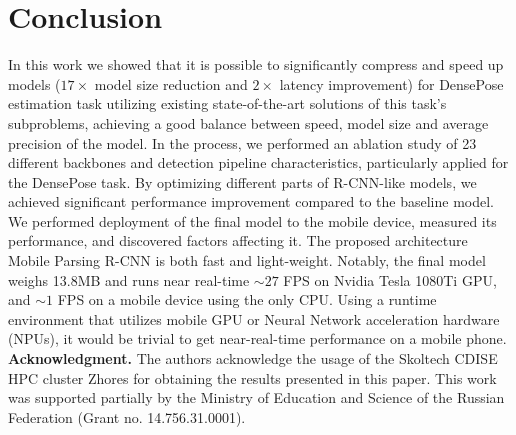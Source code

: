 \section{Conclusion}

In this work we showed that it is possible to significantly compress and speed up models ($17\times$ model size reduction and $2\times$ latency improvement) for DensePose estimation task utilizing existing state-of-the-art solutions of this task's subproblems, achieving a good balance between speed, model size and average precision of the model. In the process, we performed an ablation study of 23 different backbones and detection pipeline characteristics, particularly applied for the DensePose task.
By optimizing different parts of R-CNN-like models, we achieved significant performance improvement compared to the baseline model.
We performed deployment of the final model to the mobile device, measured its performance, and discovered factors affecting it. 
The proposed architecture Mobile Parsing R-CNN is both fast and light-weight. Notably, the final model weighs 13.8MB and runs near real-time $\sim27$ FPS on Nvidia Tesla 1080Ti GPU, and $\sim1$ FPS on a mobile device using the only CPU. Using a runtime environment that utilizes mobile GPU or Neural Network acceleration hardware (NPUs), it would be trivial to get near-real-time performance on a mobile phone.
\newline\newline
\noindent\textbf{Acknowledgment.} The authors acknowledge the usage of the Skoltech CDISE HPC cluster Zhores for obtaining the results presented in this paper. This work was supported partially by the Ministry of Education and Science of the Russian Federation (Grant no. 14.756.31.0001).